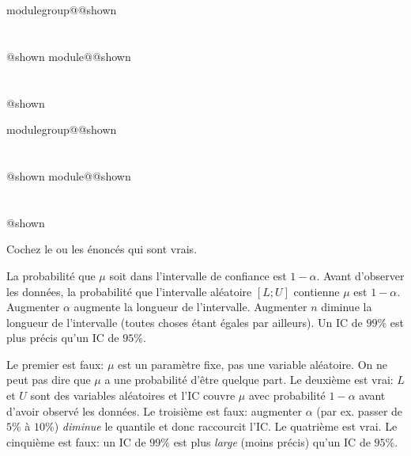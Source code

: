 \documentclass{Evaluation}
\makeatletter
\newcommand{\currentmodulekey}{}
\newcommand{\currentmoduletitle}{}
\newcommand{\currentgroupkey}{}
\newcommand{\currentgrouptitle}{}
\newcommand{\showmoduleifneeded}{%
  \ifx\currentgroupkey\empty\else
    \expandafter\ifx\csname modulegroup@\currentgroupkey @shown\endcsname\relax
      \section*{\currentgrouptitle}%
      \expandafter\gdef\csname modulegroup@\currentgroupkey @shown\endcsname{1}%
    \fi
  \fi
  \expandafter\ifx\csname module@\currentmodulekey @shown\endcsname\relax
    \section*{\currentmoduletitle}%
    \expandafter\gdef\csname module@\currentmodulekey @shown\endcsname{1}%
  \fi
}
\newenvironment{A25}{\showmoduleifneeded}{}
\makeatother
\begin{document}
\begin{questions}
\begin{A25}
\end{A25}

\begin{A25}
\question Cochez le ou les énoncés qui sont vrais.

\begin{checkboxes}
    \choice La probabilité que $\mu$ soit dans l'intervalle de confiance est $1-\alpha$.
    \correctchoice Avant d'observer les données, la probabilité que l'intervalle aléatoire $[L;U]$ contienne $\mu$ est $1-\alpha$.
    \choice Augmenter $\alpha$ augmente la longueur de l'intervalle.
    \correctchoice Augmenter $n$ diminue la longueur de l'intervalle (toutes choses étant égales par ailleurs).
    \choice Un IC de $99\%$ est plus précis qu'un IC de $95\%$.
\end{checkboxes}

\begin{solution}
    Le premier est faux: $\mu$ est un paramètre fixe, pas une variable aléatoire. On ne peut pas dire que $\mu$ a une probabilité d'être quelque part. Le deuxième est vrai: $L$ et $U$ sont des variables aléatoires et l'IC couvre $\mu$ avec probabilité $1-\alpha$ avant d'avoir observé les données. Le troisième est faux: augmenter $\alpha$ (par ex. passer de $5\%$ à $10\%$) \textit{diminue} le quantile et donc raccourcit l'IC. Le quatrième est vrai. Le cinquième est faux: un IC de $99\%$ est plus \textit{large} (moins précis) qu'un IC de $95\%$.
\end{solution}
\end{A25}


\end{questions}
\end{document}
